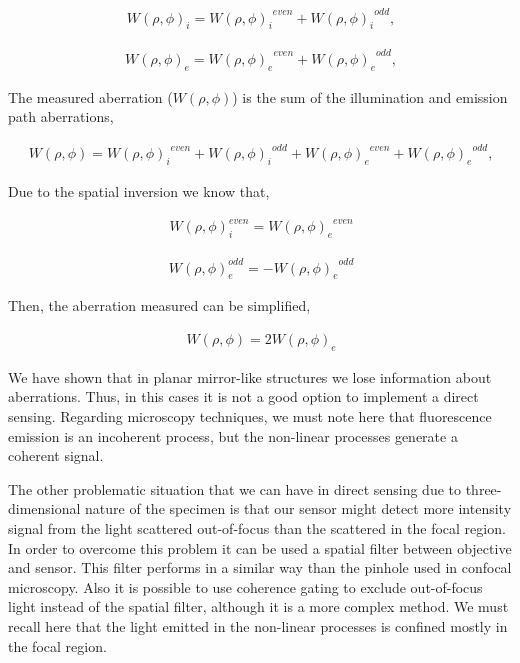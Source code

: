 \begin{align}
	\ W(\rho,\phi)_i = {{W(\rho,\phi)_i}^{even}} + {{W(\rho,\phi)_i}^{odd}},
	\label{eq:aberration_i_even_odd_sum}
\end{align}   

\begin{align}
	\ W(\rho,\phi)_e = {{W(\rho,\phi)_e}^{even}} + {{W(\rho,\phi)_e}^{odd}},
	\label{eq:aberration_e_even_odd_sum}
\end{align}   

The measured aberration ($W(\rho,\phi)$) is the sum of the illumination and emission path aberrations,

\begin{align}
	\ W(\rho,\phi) = {{W(\rho,\phi)_i}^{even}} + {{W(\rho,\phi)_i}^{odd}}+{{W(\rho,\phi)_e}^{even}} + {{W(\rho,\phi)_e}^{odd}},
	\label{eq:aberration_sum_il_em}
\end{align}  

Due to the spatial inversion we know that,

\begin{align}
	\ W(\rho,\phi)_i^{even}={{W(\rho,\phi)_e}^{even}}
	\label{eq:spat_inversion_even}
\end{align}
	
\begin{align}
	\ W(\rho,\phi)_e^{odd}=-{{W(\rho,\phi)_e}^{odd}}
	\label{eq:spat_inversion_odd}
\end{align} 

Then, the aberration measured can be simplified, 

\begin{align}
	\ W(\rho,\phi)=2 {{W(\rho,\phi)_e}}
	\label{eq:ab_measured_spat_inver}
\end{align} 

We have shown that in planar mirror-like structures we lose information about aberrations. Thus, in this cases it is not a good option to implement a direct sensing. Regarding microscopy techniques, we must note here that fluorescence emission is an incoherent process, but the non-linear processes generate a coherent signal.

The other problematic situation that we can have in direct sensing due to three-dimensional nature of the specimen is that our sensor might detect more intensity signal from the light scattered out-of-focus than the scattered in the focal region. In order to overcome this problem it can be used a spatial filter between objective and sensor. This filter performs in a similar way than the pinhole used in confocal microscopy. Also it is possible to use coherence gating to exclude out-of-focus light instead of the spatial filter, although it is a more complex method. We must recall here that the light emitted in the non-linear processes is confined mostly in the focal region.

